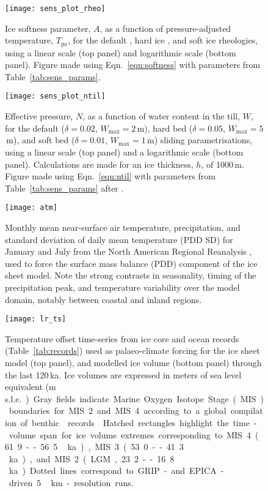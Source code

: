 \documentclass[tc, manuscript]{copernicus}
\begin{document}
\begin{figure}%
\texttt{[image: sens\_plot\_rheo]}
\caption{%
      Ice softness parameter, $A$, as a function of pressure-adjusted
      temperature, $T_{\text{pa}}$, for the default
      \citep{Paterson.Budd.1982}, hard ice \citep[with
      $E_{\text{SIA}}=1$]{Cuffey.Paterson.2010}, and soft ice \citep[with
      $E_{\text{SIA}}=5$]{Cuffey.Paterson.2010} rheologies, using a linear
      scale (top panel) and logarithmic scale (bottom panel). Figure made
      using Eqn.~\ref{eqn:softness} with parameters from
      Table~\ref{tab:sens_params}.}
\label{fig:sens_plot_rheo}%
\end{figure}%


\begin{figure}%
\texttt{[image: sens\_plot\_ntil]}
\caption{%
      Effective pressure, $N$, as a function of water content in the till,
      $W$, for the default ($\delta=0.02$, $W_{\text{max}}=2$\,m), hard bed
      ($\delta=0.05$, $W_{\text{max}}=5$\,m), and soft bed ($\delta=0.01$,
      $W_{\text{max}}=1$\,m) sliding parametrisations, using a linear scale
      (top panel) and a logarithmic scale (bottom panel). Calculations are
      made for an ice thickness, $h$, of 1000\,m. Figure made using
      Eqn.~\ref{eqn:ntil} with parameters from Table~\ref{tab:sens_params}
      after \citet[Fig.~1]{Bueler.Pelt.2015}.}
\label{fig:sens_plot_ntil}%
\end{figure}%


\begin{figure}%
\texttt{[image: atm]}
\caption{%
      Monthly mean near-surface air temperature, precipitation, and standard
      deviation of daily mean temperature (PDD SD) for January and July from
      the North American Regional Reanalysis
      \citep[NARR;][]{Mesinger.etal.2006}, used to force the surface mass
      balance (PDD) component of the ice sheet model. Note the strong
      contrasts in seasonality, timing of the precipitation peak, and
      temperature variability over the model domain, notably between coastal
      and inland regions.}
\label{fig:atm}%
\end{figure}%


\begin{figure*}%
\texttt{[image: lr\_ts]}
\caption{%
      Temperature offset time-series from ice core and ocean records
      (Table~\ref{tab:records}) used as palaeo-climate forcing for the ice
      sheet model (top panel), and modelled ice volume (bottom panel)
      through the last 120\,\unit{ka}. Ice volumes are expressed in meters
      of sea level equivalent (\unit{m\,s.l.e.}). Gray fields indicate Marine
      Oxygen Isotope Stage (MIS) boundaries for MIS~2 and MIS~4 according to
      a~global compilation of benthic  records
      \citep{Lisiecki.Raymo.2005}. Hatched rectangles highlight the
      time-volume span for ice volume extremes corresponding to MIS~4
      (61.9--56.5\,\unit{ka}), MIS~3 (53.0--41.3\,\unit{ka}), and MIS~2
      (LGM, 23.2--16.8\,\unit{ka}). Dotted lines correspond to GRIP- and
      EPICA-driven 5\,\unit{km}-resolution runs.}
\label{fig:lr_ts}%
\end{figure*}%
\end{document}
